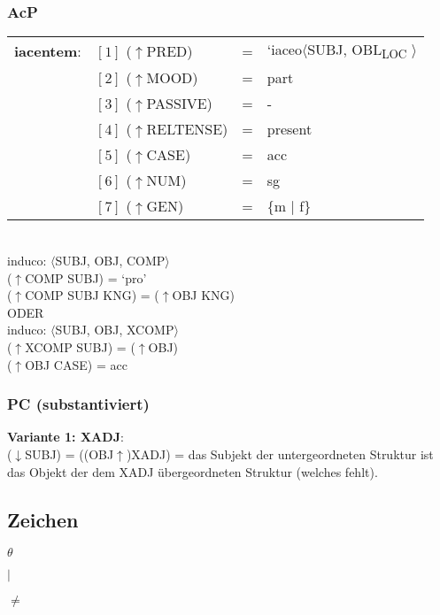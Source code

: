 \documentclass[12pt,a4paper]{article}
\begin{document}
\subsubsection{AcP}

\begin{tabular}{ l  l  l  l  } 
\textbf{iacentem}: & $[1]$ \: ($\uparrow$PRED) & = & `iaceo$\langle$SUBJ, OBL\textsubscript{LOC} $\rangle$\\
$\qquad$ & $[2]$ \: ($\uparrow$MOOD) & = & part\\
$\qquad$ & $[3]$ \: ($\uparrow$PASSIVE) & = & - \\
$\qquad$ & $[4]$ \: ($\uparrow$RELTENSE) & = & present \\
$\qquad$ & $[5]$ \: ($\uparrow$CASE) & = & acc \\
$\qquad$ & $[6]$ \: ($\uparrow$NUM) & = & sg \\
$\qquad$ & $[7]$ \: ($\uparrow$GEN) & = & \{m $\mid$ f\} \\
\end{tabular}\\
\newline
\newline
induco: $\langle$SUBJ, OBJ, COMP$\rangle$\\
($\uparrow$COMP SUBJ) = `pro'\\
($\uparrow$COMP SUBJ KNG) = ($\uparrow$OBJ KNG)\\

ODER\\
induco: $\langle$SUBJ, OBJ, XCOMP$\rangle$\\
($\uparrow$XCOMP SUBJ) = ($\uparrow$OBJ)\\
($\uparrow$OBJ CASE) = acc\\

\subsubsection{PC (substantiviert)}
\textbf{Variante 1: XADJ}:\\
($\downarrow$SUBJ) = ((OBJ$\uparrow$)XADJ)
= das Subjekt der untergeordneten Struktur ist das Objekt der dem XADJ übergeordneten Struktur (welches fehlt).


\subsection{Zeichen}

$\theta$

$\mid$

$\neq$
\end{document}
